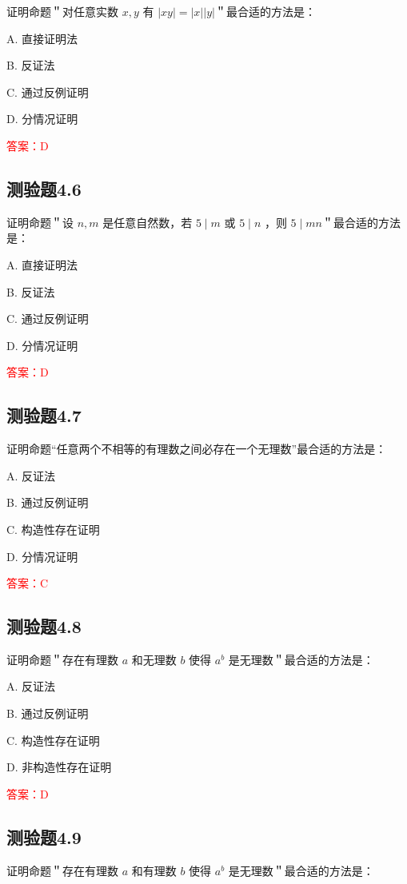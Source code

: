 \documentclass[UTF8, heading=true]{ctexart}
\begin{document}
证明命题＂对任意实数 $x, y$ 有 $|x y|=|x||y|$＂最合适的方法是：

A. 直接证明法

B. 反证法

C. 通过反例证明

D. 分情况证明

\textcolor{red}{答案：D}

\subsection{测验题4.6}

证明命题＂设 $n, m$ 是任意自然数，若 $5 \mid m$ 或 $5 \mid n$ ，则 $5 \mid m n$＂最合适的方法是：

A. 直接证明法

B. 反证法

C. 通过反例证明

D. 分情况证明

\textcolor{red}{答案：D}

\subsection{测验题4.7}

证明命题“任意两个不相等的有理数之间必存在一个无理数”最合适的方法是：

A. 反证法

B. 通过反例证明

C. 构造性存在证明

D. 分情况证明

\textcolor{red}{答案：C}

\subsection{测验题4.8}

证明命题＂存在有理数 $a$ 和无理数 $b$ 使得 $a^b$ 是无理数＂最合适的方法是：

A. 
反证法

B. 
通过反例证明

C. 
构造性存在证明

D. 
非构造性存在证明

\textcolor{red}{答案：D}

\subsection{测验题4.9}

证明命题＂存在有理数 $a$ 和有理数 $b$ 使得 $a^b$ 是无理数＂最合适的方法是：
\end{document}

